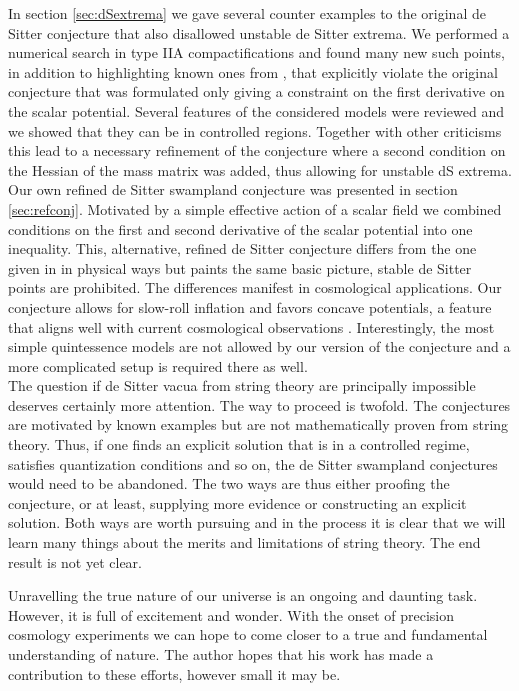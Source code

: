 \documentclass[a4paper,12pt,twoside,openright]{report}
\begin{document}
In section \ref{sec:dSextrema} we gave several counter examples to the original de Sitter conjecture \cite{Roupec:2018mbn} that also disallowed unstable de Sitter extrema. We performed a numerical search in type IIA compactifications and found many new such points, in addition to highlighting known ones from \cite{Caviezel:2008tf,Flauger:2008ad}, that explicitly violate the original conjecture that was formulated only giving a constraint on the first derivative on the scalar potential. Several features of the considered models were reviewed and we showed that they can be in controlled regions. Together with other criticisms this lead to a necessary refinement of the conjecture \cite{Ooguri:2018wrx} where a second condition on the Hessian of the mass matrix was added, thus allowing for unstable dS extrema.\\
Our own refined de Sitter swampland conjecture \cite{Andriot:2018mav} was presented in section \ref{sec:refconj}. Motivated by a simple effective action of a scalar field we combined conditions on the first and second derivative of the scalar potential into one inequality. This, alternative, refined de Sitter conjecture differs from the one given in \cite{Ooguri:2018wrx} in physical ways but paints the same basic picture, stable de Sitter points are prohibited. The differences manifest in cosmological applications. Our conjecture allows for slow-roll inflation and favors concave potentials, a feature that aligns well with current cosmological observations \cite{Planck:2018jri}. Interestingly, the most simple quintessence models are not allowed by our version of the conjecture and a more complicated setup is required there as well.\\
The question if de Sitter vacua from string theory are principally impossible deserves certainly more attention. The way to proceed is twofold. The conjectures are motivated by known examples but are not mathematically proven from string theory. Thus, if one finds an explicit solution that is in a controlled regime, satisfies quantization conditions and so on, the de Sitter swampland conjectures would need to be abandoned. The two ways are thus either proofing the conjecture, or at least, supplying more evidence or constructing an explicit solution. Both ways are worth pursuing and in the process it is clear that we will learn many things about the merits and limitations of string theory. The end result is not yet clear.

\vspace{12pt}
Unravelling the true nature of our universe is an ongoing and daunting task. However, it is full of excitement and wonder. With the onset of precision cosmology experiments we can hope to come closer to a true and fundamental understanding of nature. The author hopes that his work has made a contribution to these efforts, however small it may be.
\end{document}
